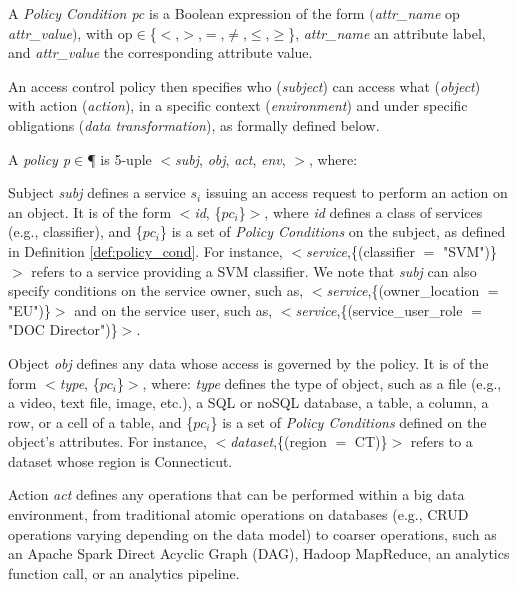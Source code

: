      \begin{definition}\label{def:policy_cond}
        A \emph{Policy Condition pc} is a Boolean expression of the form $($\emph{attr\_name} op \emph{attr\_value}$)$, with op$\in$\{$<$,$>$,$=$,$\neq$,$\leq$,$\geq$\}, \emph{attr\_name} an attribute label, and \emph{attr\_value} the corresponding attribute value.
      \end{definition}

      An access control policy then specifies who (\emph{subject}) can access what (\emph{object}) with action (\emph{action}), in a specific context (\emph{environment}) and under specific obligations (\emph{data transformation}), as formally defined below.

      \begin{definition}[Policy]\label{def:policy_rule}
        A {\it policy p}$\in$\P{} is 5-uple $<$\textit{subj}, \textit{obj}, \textit{act}, \textit{env}, \textit{\TP}$>$, where:
        \begin{description}
          \item Subject \textit{subj} defines a service $s_i$ issuing an access request to perform an action on an object. It is of the form $<$\emph{id}, \{$pc_i$\}$>$, where \emph{id} defines a class of services (e.g., classifier), and \{$pc_i$\} is a set of \emph{Policy Conditions} on the subject, as defined in Definition \ref{def:policy_cond}. For instance, $<$\emph{service},\{(classifier $=$ "SVM")\}$>$ refers to a service providing a SVM classifier. We note that \textit{subj} can also specify conditions on the service owner, such as, $<$\emph{service},\{(owner\_location $=$ "EU")\}$>$ and on the service user, such as, $<$\emph{service},\{(service\_user\_role $=$ "DOC Director")\}$>$.

          \item Object \textit{obj} defines any data whose access is governed by the policy. It is of the form $<$\emph{type}, \{$pc_i$\}$>$, where: \emph{type} defines the type of object, such as a file (e.g., a video, text file, image, etc.), a SQL or noSQL database, a table, a column, a row, or a cell of a table, and \{$pc_i$\} is a set of \emph{Policy Conditions} defined on the object's attributes. For instance, $<$\emph{dataset},\{(region $=$ CT)\}$>$ refers to a dataset whose region is Connecticut.

          \item Action \textit{act} defines any operations that can be performed within a big data environment, from traditional atomic operations on databases (e.g., CRUD operations varying depending on the data model) to coarser operations, such as an Apache Spark Direct Acyclic Graph (DAG), Hadoop MapReduce, an analytics function call, or an analytics pipeline.


\end{description}
\end{definition}
